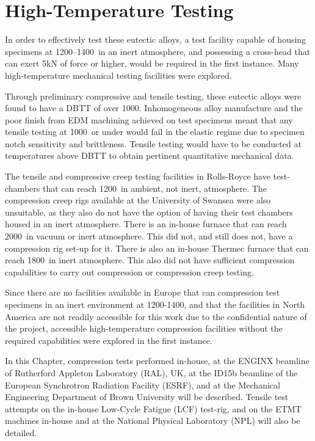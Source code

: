
\chapter{High-Temperature Testing}

In order to effectively test these eutectic alloys, a test facility capable of housing specimens at 1200--1400\celsius\ in an inert atmosphere, and possessing a cross-head that can exert 5kN of force or higher, would be required in the first instance.  Many high-temperature mechanical testing facilities were explored.

Through preliminary compressive and tensile testing, these eutectic alloys were found to have a DBTT of over 1000\celsius.  Inhomogeneous alloy manufacture and the poor finish from EDM machining achieved on test specimens meant that any tensile testing at 1000\celsius\ or under would fail in the elastic regime due to specimen notch sensitivity and brittleness.  Tensile testing would have to be conducted at temperatures above DBTT to obtain pertinent quantitative mechanical data.

The tensile and compressive creep testing facilities in Rolls-Royce have test-chambers that can reach 1200\celsius\ in ambient, not inert, atmosphere.  The compression creep rigs available at the University of Swansea were also unsuitable, as they also do not have the option of having their test chambers housed in an inert atmosphere.  There is an in-house furnace that can reach 2000\celsius\ in vacuum or inert atmosphere.  This did not, and still does not, have a compression rig set-up for it.  There is also an in-house Thermec furnace that can reach 1800\celsius\ in inert atmosphere.  This also did not have sufficient compression capabilities to carry out compression or compression creep testing.

Since there are no facilities available in Europe that can compression test specimens in an inert environment at 1200-1400\celsius, and that the facilities in North America are not readily accessible for this work due to the confidential nature of the project, accessible high-temperature compression facilities without the required capabilities were explored in the first instance.  

In this Chapter, compression tests performed in-house, at the ENGINX beamline of Rutherford Appleton Laboratory (RAL), UK, at the ID15b beamline of the European Synchrotron Radiation Facility (ESRF), and at the Mechanical Engineering Department of Brown University will be described. Tensile test attempts on the in-house Low-Cycle Fatigue (LCF) test-rig, and on the ETMT machines in-house and at the National Physical Laboratory (NPL) will also be detailed.

